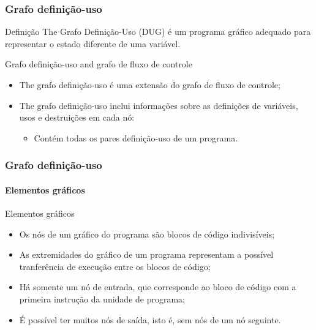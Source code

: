\begin{frame}[parent={cmap:structural-software-testing},hasnext=true,hasprev=true]
\frametitle{Grafo definição-uso}
\label{concept:program-graph}
\label{concept:definition-use-graph}
\label{concept:dug}

\begin{block:concept}{Definição}
The Grafo Definição-Uso (DUG) é um programa gráfico adequado para representar o estado diferente de uma variável.
\end{block:concept}

\begin{block:fact}{Grafo definição-uso and grafo de fluxo de controle}
\begin{itemize}
	\item The grafo definição-uso é uma extensão do grafo de fluxo de controle;

	\item The grafo definição-uso inclui informações sobre as definições de variáveis, usos e destruições em cada nó:
	\begin{itemize}
		\item Contém todas os pares definição-uso de um programa.
	\end{itemize}
\end{itemize}
\end{block:fact}
\end{frame}


\begin{frame}
\frametitle{Grafo definição-uso}
\framesubtitle{Elementos gráficos}
\label{concept:cfg-graph-elements}

\begin{block:fact}{Elementos gráficos}
\begin{itemize}
	\item Os nós de um gráfico do programa são blocos de código indivisíveis;

	\item As extremidades do gráfico de um programa representam a possível tranferência de execução entre os blocos de código;

	\item Há somente um nó de entrada, que corresponde ao bloco de código com a primeira instrução da unidade de programa;

	\item É possível ter muitos nós de saída, isto é, sem nós de um nó seguinte.
\end{itemize}
\end{block:fact}

\hfill
{}
\end{frame}


